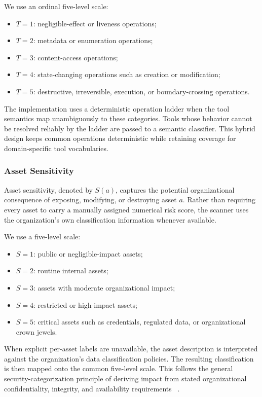 \documentclass[sigconf]{acmart}
\begin{document}
We use an ordinal five-level scale:

\begin{itemize}
    \item $T=1$: negligible-effect or liveness operations;
    \item $T=2$: metadata or enumeration operations;
    \item $T=3$: content-access operations;
    \item $T=4$: state-changing operations such as creation or modification;
    \item $T=5$: destructive, irreversible, execution, or boundary-crossing
          operations.
\end{itemize}

The implementation uses a deterministic operation ladder when the tool
semantics map unambiguously to these categories. Tools whose behavior cannot
be resolved reliably by the ladder are passed to a semantic classifier. This
hybrid design keeps common operations deterministic while retaining coverage
for domain-specific tool vocabularies.


\subsubsection{Asset Sensitivity}
\label{sec:sensitivity}

Asset sensitivity, denoted by $S(a)$, captures the potential organizational
consequence of exposing, modifying, or destroying asset $a$. Rather than
requiring every asset to carry a manually assigned numerical risk score,
the scanner uses the organization's own classification information whenever
available.

We use a five-level scale:

\begin{itemize}
    \item $S=1$: public or negligible-impact assets;
    \item $S=2$: routine internal assets;
    \item $S=3$: assets with moderate organizational impact;
    \item $S=4$: restricted or high-impact assets;
    \item $S=5$: critical assets such as credentials, regulated data, or
          organizational crown jewels.
\end{itemize}

When explicit per-asset labels are unavailable, the asset description
is interpreted against the organization's data classification policies. The resulting
classification is then mapped onto the common five-level scale. This follows
the general security-categorization principle of deriving impact from stated
organizational confidentiality, integrity, and availability requirements
~\cite{nist2004fips199,nist2008sp80060}.
\end{document}
